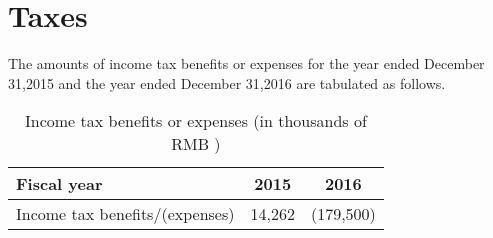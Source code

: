 

\chapter{Taxes}

The amounts of income tax benefits or expenses for the year ended December 31,2015 and the year ended December 31,2016 are tabulated as follows.


\begin{table}	
	\begin{center}
		\begin{tabular}{lcc}
			\toprule
			\textbf{Fiscal year}&\textbf{2015}&\textbf{2016}\\
			\midrule
			Income tax benefits/(expenses)&14,262&(179,500)\\
			\bottomrule
		\end{tabular}
	\end{center}
	\caption{Income tax benefits or expenses (in thousands of RMB \textyen)}\label{table:1}
\end{table}


